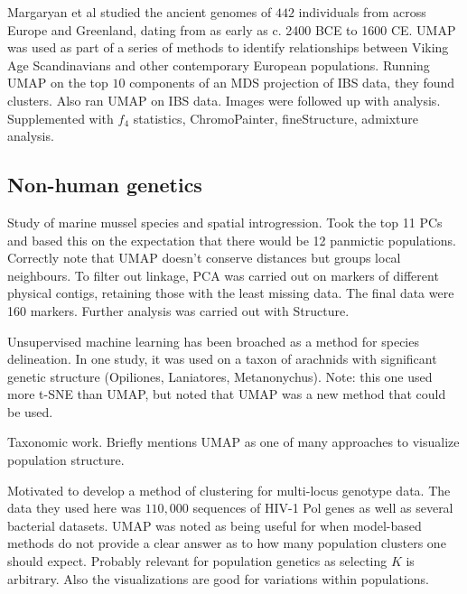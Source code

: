 \documentclass[12pt]{article}
\begin{document}
Margaryan et al\cite{margaryan_population_2019} studied the ancient genomes of $442$ individuals from across Europe and Greenland, dating from as early as c. 2400 BCE to 1600 CE. UMAP was used as part of a series of methods to identify relationships between Viking Age Scandinavians and other contemporary European populations. Running UMAP on the top $10$ components of an MDS projection of IBS data, they found clusters. Also ran UMAP on IBS data. Images were followed up with analysis. Supplemented with $f_4$ statistics, ChromoPainter, fineStructure, admixture analysis.

\subsection*{Non-human genetics}

Study of marine mussel species and spatial introgression. Took the top 11 PCs and based this on the expectation that there would be 12 panmictic populations. Correctly note that UMAP doesn't conserve distances but groups local neighbours. To filter out linkage, PCA was carried out on markers of different physical contigs, retaining those with the least missing data. The final data were 160 markers. Further analysis was carried out with Structure. \cite{simon_local_2019}

Unsupervised machine learning has been broached as a method for species delineation. In one study, it was used on a taxon of arachnids with significant genetic structure (Opiliones, Laniatores, Metanonychus). Note: this one used more t-SNE than UMAP, but noted that UMAP was a new method that could be used.\cite{derkarabetian_demonstration_2019}

Taxonomic work. Briefly mentions UMAP as one of many approaches to visualize population structure. \cite{greenbaum_network-based_2019}

Motivated to develop a method of clustering for multi-locus genotype data. The data they used here was $110,000$ sequences of HIV-1 Pol genes as well as several bacterial datasets. UMAP was noted as being useful for when model-based methods do not provide a clear answer as to how many population clusters one should expect. Probably relevant for population genetics as selecting $K$ is arbitrary. Also the visualizations are good for variations within populations.\cite{tonkin-hill_fast_2019}

\end{document}
